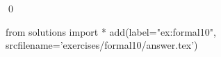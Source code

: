 
\begin{ex} 
  \label{ex:formal10}
  
  \qed
\end{ex} 
\begin{python0}
from solutions import *
add(label="ex:formal10",
    srcfilename='exercises/formal10/answer.tex') 
\end{python0}
